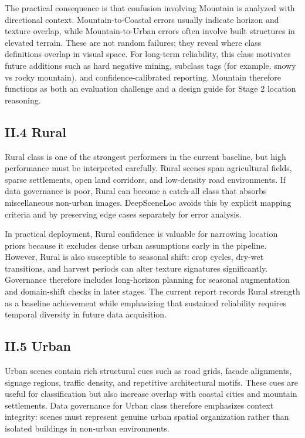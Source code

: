 The practical consequence is that confusion involving Mountain is analyzed with directional context. Mountain-to-Coastal errors usually indicate horizon and texture overlap, while Mountain-to-Urban errors often involve built structures in elevated terrain. These are not random failures; they reveal where class definitions overlap in visual space. For long-term reliability, this class motivates future additions such as hard negative mining, subclass tags (for example, snowy vs rocky mountain), and confidence-calibrated reporting. Mountain therefore functions as both an evaluation challenge and a design guide for Stage 2 location reasoning.

\subsection*{II.4 Rural}
Rural class is one of the strongest performers in the current baseline, but high performance must be interpreted carefully. Rural scenes span agricultural fields, sparse settlements, open land corridors, and low-density road environments. If data governance is poor, Rural can become a catch-all class that absorbs miscellaneous non-urban images. DeepSceneLoc avoids this by explicit mapping criteria and by preserving edge cases separately for error analysis.

In practical deployment, Rural confidence is valuable for narrowing location priors because it excludes dense urban assumptions early in the pipeline. However, Rural is also susceptible to seasonal shift: crop cycles, dry-wet transitions, and harvest periods can alter texture signatures significantly. Governance therefore includes long-horizon planning for seasonal augmentation and domain-shift checks in later stages. The current report records Rural strength as a baseline achievement while emphasizing that sustained reliability requires temporal diversity in future data acquisition.

\subsection*{II.5 Urban}
Urban scenes contain rich structural cues such as road grids, facade alignments, signage regions, traffic density, and repetitive architectural motifs. These cues are useful for classification but also increase overlap with coastal cities and mountain settlements. Data governance for Urban class therefore emphasizes context integrity: scenes must represent genuine urban spatial organization rather than isolated buildings in non-urban environments.

